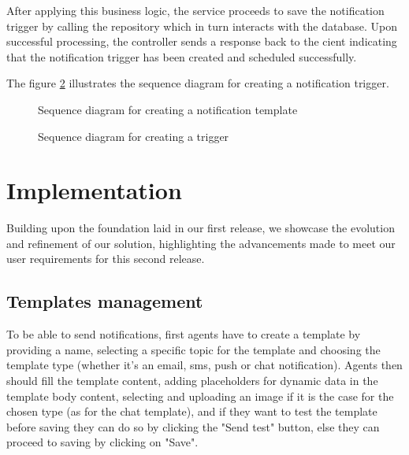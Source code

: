 After applying this business logic, the service proceeds to save the notification trigger by calling
the repository which in turn interacts with the database. Upon successful processing, the controller sends
a response back to the cient indicating that the notification trigger has been created and scheduled successfully.

\noindent The figure \ref{seq-create-trigger} illustrates the sequence diagram for creating a notification trigger.

\begin{landscape}
    \begin{figure}[hbt!]
        \centering
        
        \caption{Sequence diagram for creating a notification template}
        \label{seq-create-template}
    \end{figure}
\end{landscape}

\begin{landscape}
    \begin{figure}[hbt!]
        \centering
        
        \caption{Sequence diagram for creating a trigger}
        \label{seq-create-trigger}
    \end{figure}
\end{landscape}

\section{Implementation}
Building upon the foundation laid in our first release, we showcase the evolution and refinement of
our solution, highlighting the advancements made to meet our user requirements for this second release.

\subsection{Templates management}
To be able to send notifications, first agents have to create a template by providing a name, selecting
a specific topic for the template and choosing the template type (whether it's an email, sms, push or
chat notification). Agents then should fill the template content, adding placeholders for dynamic data
in the template body content, selecting and uploading an image if it is the case for the chosen type
(as for the chat template), and if they want to test the template before saving they can do so by
clicking the "Send test" button, else they can proceed to saving by clicking on "Save".

